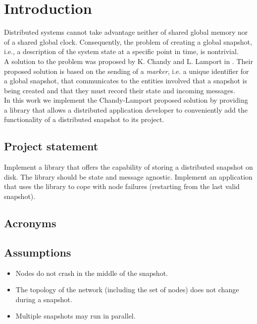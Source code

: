 \section{Introduction}
Distributed systems cannot take advantage neither of shared global memory nor of a shared global clock. Consequently, the problem of creating a global snapshot, i.e., a description of the system state at a specific point in time, is nontrivial. \\ 

A solution to the problem was proposed by K. Chandy and L. Lamport in \cite{10.1145/214451.214456}. Their proposed solution is based on the sending of a \textit{marker}, i.e. a unique identifier for a global snapshot, that communicates to the entities involved that a snapshot is being created and that they must record their state and incoming messages. \\ 

In this work we implement the Chandy-Lamport proposed solution by providing a library that allows a distributed application developer to conveniently add the functionality of a distributed snapshot to its project. 


\subsection{Project statement}
Implement a library that offers the capability of storing a distributed snapshot on disk. The library should be state and message agnostic. Implement an application that uses the library to cope with node failures (restarting from the last valid snapshot).


\subsection{Acronyms}

\subsection{Assumptions}
\begin{itemize}
    \item Nodes do not crash in the middle of the snapshot. 
    \item The topology of the network (including the set of nodes) does not change during a snapshot.
    \item Multiple snapshots may run in parallel.
\end{itemize} 
 